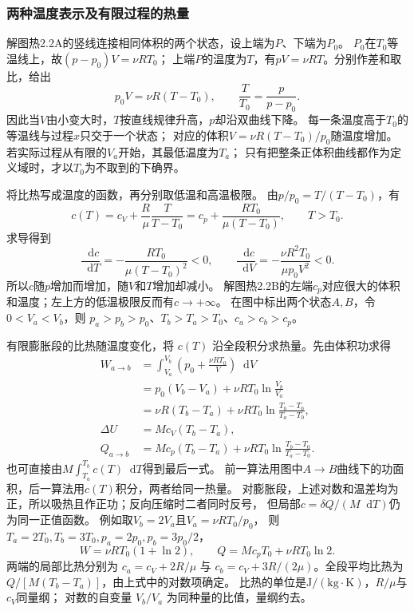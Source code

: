 \documentclass[UTF8,fontset=fandol,a4paper,11pt]{ctexart}
\newcommand{\dd}{\mathop{}\!\mathrm{d}}
\begin{document}
\subsubsection*{两种温度表示及有限过程的热量}
解图热2.2A的竖线连接相同体积的两个状态，设上端为$P$、下端为$P_0$。
$P_0$在$T_0$等温线上，故$(p-p_0)V=\nu RT_0$；
上端$P$的温度为$T$，有$pV=\nu RT$。分别作差和取比，给出
\[
p_0V=\nu R(T-T_0),\qquad
\frac T{T_0}=\frac p{p-p_0}.
\]
因此当$V$由小变大时，$T$按直线规律升高，$p$却沿双曲线下降。
每一条温度高于$T_0$的等温线与过程$x$只交于一个状态；
对应的体积$V=\nu R(T-T_0)/p_0$随温度增加。
若实际过程从有限的$V_a$开始，其最低温度为$T_a$；
只有把整条正体积曲线都作为定义域时，才以$T_0$为不取到的下确界。

将比热写成温度的函数，再分别取低温和高温极限。
由$p/p_0=T/(T-T_0)$，有
\[
c(T)=c_V+\frac R\mu\frac T{T-T_0}
=c_p+\frac{RT_0}{\mu(T-T_0)},\qquad T>T_0.
\]
求导得到
\[
\frac{\dd c}{\dd T}=-\frac{RT_0}{\mu(T-T_0)^2}<0,\qquad
\frac{\dd c}{\dd V}=-\frac{\nu R^2T_0}{\mu p_0V^2}<0.
\]
所以$c$随$p$增加而增加，随$V$和$T$增加却减小。
解图热2.2B的左端$c_p$对应很大的体积和温度；左上方的低温极限反而有$c\to+\infty$。
在图中标出两个状态$A,B$，令$0<V_a<V_b$，则
$p_a>p_b>p_0$、$T_b>T_a>T_0$、$c_a>c_b>c_p$。

有限膨胀段的比热随温度变化，将 $c(T)$ 沿全段积分求热量。先由体积功求得
\[
\begin{aligned}
W_{a\to b}
&=\int_{V_a}^{V_b}\left(p_0+\frac{\nu RT_0}{V}\right)\dd V\\
&=p_0(V_b-V_a)+\nu RT_0\ln\frac{V_b}{V_a}\\
&=\nu R(T_b-T_a)+\nu RT_0
 \ln\frac{T_b-T_0}{T_a-T_0},\\
\Delta U&=Mc_V(T_b-T_a),\\
Q_{a\to b}&=Mc_p(T_b-T_a)+\nu RT_0
 \ln\frac{T_b-T_0}{T_a-T_0}.
\end{aligned}
\]
也可直接由$M\int_{T_a}^{T_b}c(T)\dd T$得到最后一式。
前一算法用图中$A\to B$曲线下的功面积，后一算法用$c(T)$积分，两者给同一热量。
对膨胀段，上述对数和温差均为正，所以吸热且作正功；反向压缩时二者同时反号，
但局部$c=\delta Q/(M\dd T)$仍为同一正值函数。
例如取$V_b=2V_a$且$V_a=\nu RT_0/p_0$，
则$T_a=2T_0,T_b=3T_0,p_a=2p_0,p_b=3p_0/2$，
\[
W=\nu RT_0(1+\ln2),\qquad
Q=Mc_pT_0+\nu RT_0\ln2.
\]
两端的局部比热分别为 $c_a=c_V+2R/\mu$ 与 $c_b=c_V+3R/(2\mu)$。全段平均比热为 $Q/[M(T_b-T_a)]$，由上式中的对数项确定。
比热的单位是$\mathrm{J/(kg\cdot K)}$，$R/\mu$与$c_V$同量纲；
对数的自变量 $V_b/V_a$ 为同种量的比值，量纲约去。


\end{document}
